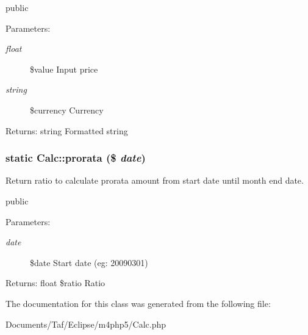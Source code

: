 public

\begin{Desc}
\item[Parameters:]
\begin{description}
\item[{\em float}]\$value Input price \item[{\em string}]\$currency Currency \end{description}
\end{Desc}
\begin{Desc}
\item[Returns:]string Formatted string \end{Desc}
\hypertarget{classCalc_9d9aafb8e61efce896ca20bc0d2a32e3}{
\subsubsection[prorata]{\setlength{\rightskip}{0pt plus 5cm}static Calc::prorata (\$ {\em date})}}
\label{classCalc_9d9aafb8e61efce896ca20bc0d2a32e3}


Return ratio to calculate prorata amount from start date until month end date.

public

\begin{Desc}
\item[Parameters:]
\begin{description}
\item[{\em date}]\$date Start date (eg: 20090301) \end{description}
\end{Desc}
\begin{Desc}
\item[Returns:]float \$ratio Ratio \end{Desc}


The documentation for this class was generated from the following file:\begin{CompactItemize}
\item 
Documents/Taf/Eclipse/m4php5/Calc.php\end{CompactItemize}
